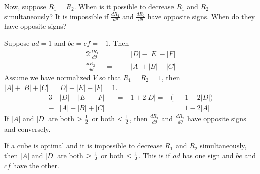 Now, suppose $R_1 = R_2$.  When is it possible to decrease $R_1$ and $R_2$
simultaneously?  It is impossible if $\frac{dR_1}{d\theta}$ and
$\frac{dR_2}{d\theta}$ have opposite signs.  When do they have opposite signs?

Suppose $ad = 1$ and $be = cf = -1$.  Then
\begin{alignat*}{2}
\frac{dR_1}{d\theta} &=  &&|D|-|E|-|F| \\
\frac{dR_2}{d\theta} &= -&&|A|+|B|+|C| 
\end{alignat*}
Assume we have normalized $V$ so that $R_1 = R_2 = 1$, then $|A|+|B|+|C| =
|D|+|E|+|F| = 1$.
\begin{alignat*}{3}
 &|D|-|E|-|F| &&= -1+2|D| = -(&&1-2|D|) \\
-&|A|+|B|+|C| &&=             &&1-2|A|
\end{alignat*}
If $|A|$ and $|D|$ are both $> \frac{1}{2}$ or both $< \frac{1}{2}$, then
$\frac{dR_1}{d\theta}$ and $\frac{dR_2}{d\theta}$ have opposite signs and
conversely.

If a cube is optimal and it is impossible to decrease $R_1$ and $R_2$
simultaneously, then $|A|$ and $|D|$ are both $> \frac{1}{2}$ or both $<
\label{refpage17}
\frac{1}{2}$.  This is if $ad$ has one sign and $be$ and $cf$ have the other.

